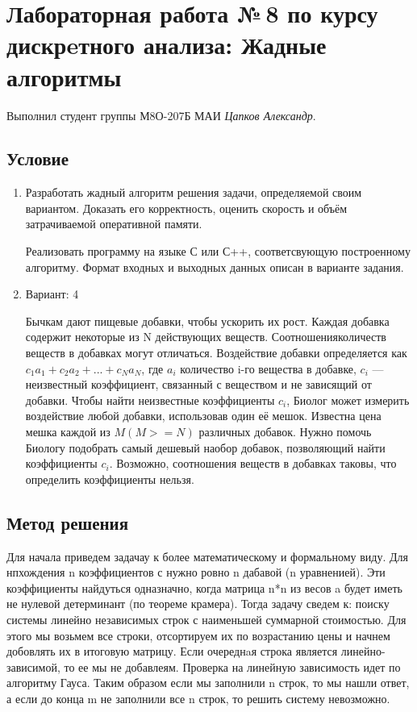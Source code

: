 \documentclass[12pt]{article}
\begin{document}
\section*{Лабораторная работа №\,8 по курсу дискрeтного анализа: Жадные алгоритмы}

Выполнил студент группы М8О-207Б МАИ \textit{Цапков Александр}.

\subsection*{Условие}

\begin{enumerate}
\item Разработать жадный алгоритм решения задачи, определяемой своим вариантом. Доказать его корректность, оценить скорость и объём затрачиваемой оперативной памяти.

Реализовать программу на языке С или С++, соответсвующую построенному алгоритму. Формат входных и выходных данных описан в варианте задания.
\item Вариант: 4

Бычкам дают пищевые добавки, чтобы ускорить их рост. Каждая добавка содержит некоторые из N действующих веществ. Соотношенияколичеств веществ в добавках могут отличаться. Воздействие добавки определяется как $c_1 a_1 + c_2 a_2 +...+c_N a_N$, где $a_i$ количество i-го вещества в добавке, $c_i$ — неизвестный коэффициент, связанный с веществом и не зависящий от добавки. Чтобы найти неизвестные коэффициенты $c_i$, Биолог может измерить воздействие любой добавки, использовав один её мешок. Известна цена мешка каждой из $M (M >= N )$ различных добавок. Нужно помочь Биологу подобрать самый дешевый наобор добавок, позволяющий найти коэффициенты $c_i$. Возможно, соотношения веществ в добавках таковы, что определить коэффициенты нельзя.

\end{enumerate}

\subsection*{Метод решения}
Для начала приведем задачау к более математическому и формальному виду. Для нпхождения n коэффициентов $с$ нужно ровно n дабавой (n уравненией). Эти коэффициенты найдуться одназначно, когда матрица n*n из весов a будет иметь не нулевой детерминант (по теореме крамера). Тогда задачу сведем к: поиску системы линейно независимых строк с наименьшей суммарной стоимостью. Для этого мы возьмем все строки, отсортируем их по возрастанию цены и начнем добовлять их в итоговую матрицу. Если очереднaя строка является линейно-зависимой, то ее мы не добавлеям. Проверка на линейную зависимость идет по алгоритму Гауса. Таким образом если мы заполнили n строк, то мы нашли ответ, а если до конца m не заполнили все n строк, то решить систему невозможно.
\end{document}
